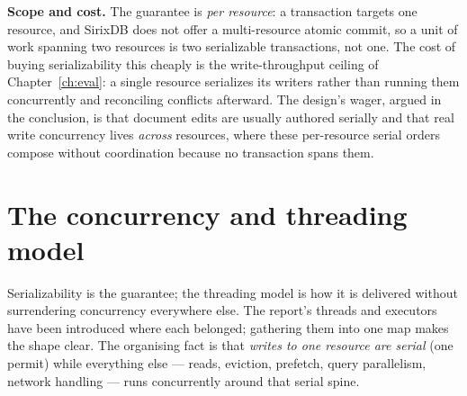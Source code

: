 \documentclass[11pt,a4paper,oneside]{report}
\theoremstyle{sirixthm}
\begin{document}
\textbf{Scope and cost.} The guarantee is \emph{per resource}: a transaction targets one resource, and
SirixDB does not offer a multi-resource atomic commit, so a unit of work spanning two resources is two
serializable transactions, not one. The cost of buying serializability this cheaply is the write-throughput
ceiling of Chapter~\ref{ch:eval}: a single resource serializes its writers rather than running them
concurrently and reconciling conflicts afterward. The design's wager, argued in the conclusion, is that
document edits are usually authored serially and that real write concurrency lives \emph{across}
resources, where these per-resource serial orders compose without coordination because no transaction
spans them.

\section{The concurrency and threading model}
\label{app:threads}

Serializability is the guarantee; the threading model is how it is delivered without surrendering
concurrency everywhere else. The report's threads and executors have been introduced where each belonged;
gathering them into one map makes the shape clear. The organising fact is that \emph{writes to one resource
are serial} (one permit) while everything else --- reads, eviction, prefetch, query parallelism, network
handling --- runs concurrently around that serial spine.
\end{document}
